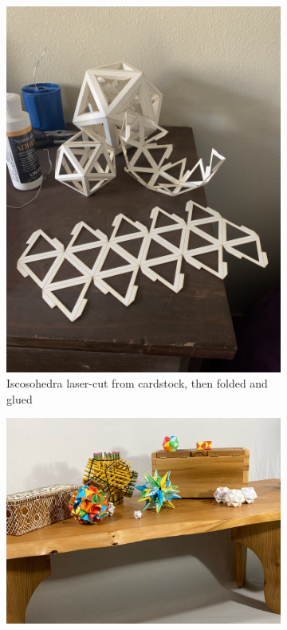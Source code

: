 \documentclass[12pt,twoside]{reedthesis}
\begin{document}
	\begin{figure}[h]
	\centering
	\begin{subfigure}{0.38\linewidth}
		\centering
		\includegraphics[width=\linewidth]{Images/Icosohedra}
		\caption{Iscosohedra laser-cut from cardstock, then folded and glued}
		\label{icosohedra}
	\end{subfigure}
	\hfill
	\begin{subfigure}{0.58\linewidth}
		\centering
		\includegraphics[width=\linewidth]{Images/PaperShapes}

\end{subfigure}
\end{figure}
\end{document}
